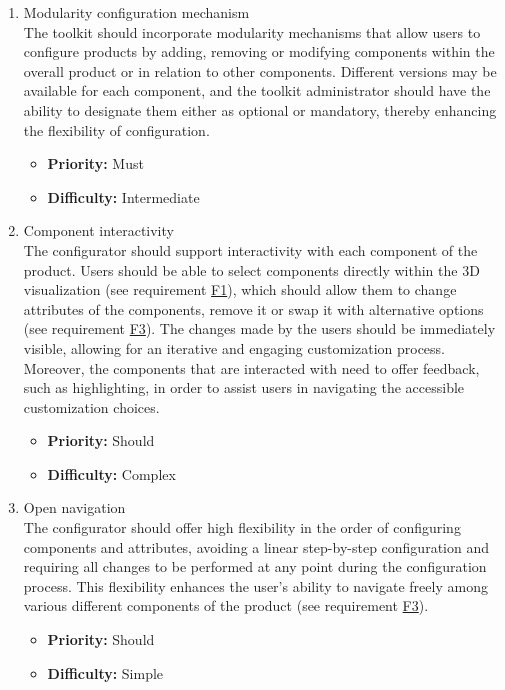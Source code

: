 \begin{enumerate}[label=\textbf{F\arabic*:}, leftmargin=*]
\item \label{itm:F3} Modularity configuration mechanism
\vspace{2pt}
\\The toolkit should incorporate modularity mechanisms that allow users to configure products by adding, removing or modifying components within the overall product or in relation to other components. Different versions may be available for each component, and the toolkit administrator should have the ability to designate them either as optional or mandatory, thereby enhancing the flexibility of configuration.
\begin{itemize}[noitemsep, label=\trianglebullet]
    \item \textbf{Priority:} Must
    \item \textbf{Difficulty:} Intermediate
\end{itemize}
\vspace{4pt}

\item \label{itm:F4} Component interactivity
\vspace{2pt}
\\The configurator should support interactivity with each component of the product. Users should be able to select components directly within the 3D visualization (see requirement \hyperref[itm:F1]{F1}), which should allow them to change attributes of the components, remove it or swap it with alternative options (see requirement \hyperref[itm:F3]{F3}). The changes made by the users should be immediately visible, allowing for an iterative and engaging customization process. Moreover, the components that are interacted with need to offer feedback, such as highlighting, in order to assist users in navigating the accessible customization choices.
\begin{itemize}[noitemsep, label=\trianglebullet]
    \item \textbf{Priority:} Should
    \item \textbf{Difficulty:} Complex
\end{itemize}
\vspace{4pt}

\item \label{itm:F5} Open navigation
\vspace{2pt}
\\The configurator should offer high flexibility in the order of configuring components and attributes, avoiding a linear step-by-step configuration and requiring all changes to be performed at any point during the configuration process. This flexibility enhances the user's ability to navigate freely among various different components of the product (see requirement \hyperref[itm:F3]{F3}).
\begin{itemize}[noitemsep, label=\trianglebullet]
    \item \textbf{Priority:} Should
    \item \textbf{Difficulty:} Simple
\end{itemize}
\vspace{4pt}


\end{enumerate}
